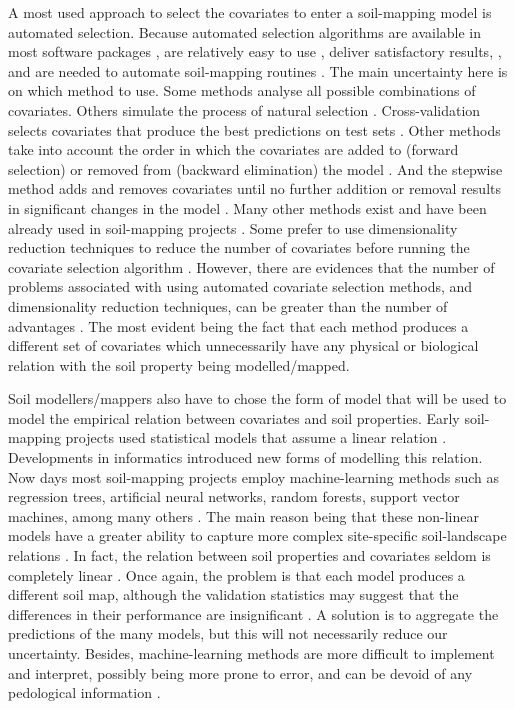 A most used approach to select the covariates to enter a soil-mapping model is automated selection.
Because automated selection algorithms are available in most software packages \citep{Harrell2001a}, 
are relatively easy to use \citep{DraperEtAl1971}, deliver satisfactory results, 
\citep{HenglEtAl2004}, and are needed to automate soil-mapping routines \citep{HenglEtAl2014}. The 
main uncertainty here is on which method to use. Some methods analyse all possible combinations of 
covariates. Others simulate the process of natural selection \citep{AndersenEtAl2010}. 
Cross-validation selects covariates that produce the best predictions on test sets 
\citep{GuyonEtAl2003}. Other methods take into account the order in which the covariates are added 
to (forward selection) or removed from (backward elimination) the model \citep{LarkEtAl2007a}. And 
the stepwise method adds and removes covariates until no further addition or removal results in 
significant changes in the model \citep{DraperEtAl1998}. Many other methods exist and have been 
already used in soil-mapping projects \citep{PoggioEtAl2013, NussbaumEtAl2014}. Some prefer to use 
dimensionality reduction techniques to reduce the number of covariates \citep{Massy1965} before 
running the covariate selection algorithm \citep{tenCatenEtAl2011a, HenglEtAl2014}. However, there 
are evidences that the number of problems associated with using automated covariate selection 
methods, and dimensionality reduction techniques, can be greater than the number of advantages 
\citep{FarrarEtAl1967, Jackson1993, Chatfield1995, Edirisooriya1995, Harrell2001a, Jolliffe2002, 
Peres-NetoEtAl2005, LarkEtAl2007a}. The most evident being the fact that each method produces a 
different set of covariates which unnecessarily have any physical or biological relation with the 
soil property being modelled/mapped.
 
Soil modellers/mappers also have to chose the form of model that will be used to model the 
empirical relation between covariates and soil properties. Early soil-mapping projects used 
statistical models that assume a linear relation \citep{MooreEtAl1993, OdehEtAl1994}.
Developments in informatics introduced new forms of modelling this relation. Now days most 
soil-mapping projects employ machine-learning methods such as regression trees, artificial neural 
networks, random forests, support vector machines, among many others \citep{HeungEtAl2016}. The 
main reason being that these non-linear models have a greater ability to capture more complex 
site-specific soil-landscape relations \citep{Grunwald2009}. In fact, the relation between soil 
properties and covariates seldom is completely linear \citep{McKenzieEtAl1999}. Once again, the 
problem is that each model produces a different soil map, although the validation statistics may 
suggest that the differences in their performance are insignificant \citep{HeungEtAl2016}. A solution
is to aggregate the predictions of the many models, but this will not necessarily reduce our 
uncertainty. Besides, machine-learning methods are more difficult to implement and interpret, 
possibly being more prone to error, and can be devoid of any pedological information 
\citep{Grunwald2009}.

